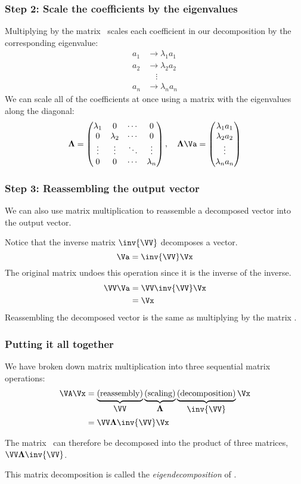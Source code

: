 \documentclass{beamer}
\begin{document}
\begin{frame}
\frametitle{Step 2: Scale the coefficients by the eigenvalues}

Multiplying by the matrix \VA\ scales each coefficient in our decomposition by the corresponding eigenvalue:
\begin{align*}
	a_1 &\rightarrow \lambda_1 a_1 \\
	a_2 &\rightarrow \lambda_2 a_2 \\
	 &\quad\vdots \\
	a_n &\rightarrow \lambda_n a_n	
\end{align*}
We can scale all of the coefficients at once using a matrix with the eigenvalues along the diagonal:
 \[ \boldsymbol{\Lambda} = \begin{pmatrix} \lambda_1 & 0 & \cdots & 0 \\ 0 & \lambda_2 & \cdots & 0 \\ \vdots & \vdots & \ddots & \vdots \\ 0 & 0 & \cdots & \lambda_n \end{pmatrix},\quad 
 \boldsymbol{\Lambda}\Va = \begin{pmatrix} \lambda_1 a_1 \\ \lambda_2 a_2 \\ \vdots \\ \lambda_n a_n \end{pmatrix} \]
\end{frame}

\begin{frame}
\frametitle{Step 3: Reassembling the output vector}

We can also use matrix multiplication to reassemble a decomposed vector into the output vector.

\bigskip
Notice that the inverse matrix $\inv{\VV}$ decomposes a vector.
\[ \Va = \inv{\VV}\Vx \]
The original matrix undoes this operation since it is the inverse of the inverse.
\begin{align*}
	\VV\Va &= \VV\inv{\VV}\Vx \\
		&= \Vx	
\end{align*}
Reassembling the decomposed vector is the same as multiplying by the matrix \VV.
\end{frame}

\begin{frame}
\frametitle{Putting it all together}

We have broken down matrix multiplication into three sequential matrix operations:
\begin{align*}
	\VA\Vx &= \underbrace{\left(\text{reassembly}\right)}_{\displaystyle \VV}
			  \underbrace{\left(\text{scaling}\right)}_{\displaystyle \boldsymbol{{\Lambda}}}
			  \underbrace{\left(\text{decomposition}\right)}_{\displaystyle \inv{\VV}}
			  \Vx \\
	&= \VV\boldsymbol{\Lambda}\inv{\VV}\Vx	
\end{align*}

The matrix \VA\ can therefore be decomposed into the product of three matrices, $\VV\boldsymbol{\Lambda}\inv{\VV}$.

\bigskip
This matrix decomposition is called the \emph{eigendecomposition} of \VA.
\end{frame}
\end{document}
